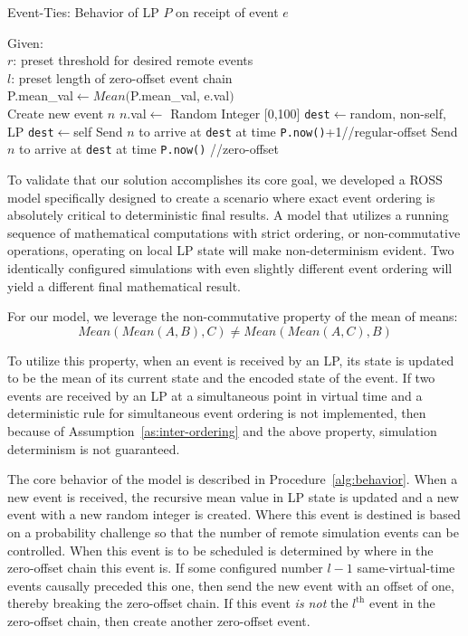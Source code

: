 \documentclass[nonacm,sigconf]{acmart}
\begin{document}
\begin{algorithm}
  \caption{Event-Ties: Behavior of LP $P$ on receipt of event $e$}\label{alg:behavior}
  \begin{algorithmic}
    \State Given:\\\hspace{.5cm}$r$: preset threshold for desired remote events\\\hspace{.5cm}$l$: preset length of zero-offset event chain\\
    \hrulefill
    \State P.mean\_val$\leftarrow Mean($P.mean\_val, e.val$)$
    \\
    \State Create new event $n$
    \State $n$.val$\leftarrow$ Random Integer [0,100]
      \State \texttt{dest}$\leftarrow$random, non-self, LP 
    \Else
      \State \texttt{dest}$\leftarrow$self
    \EndIf
      \State Send $n$ to arrive at \texttt{dest} at time \texttt{P.now()}+1\hfill //regular-offset
    \Else
      \State Send $n$ to arrive at \texttt{dest} at time \texttt{P.now()} \hfill //zero-offset
    \EndIf
    \end{algorithmic}
\end{algorithm}

To validate that our solution accomplishes its core goal, we developed a ROSS model specifically designed to create a scenario where exact event ordering is absolutely critical to deterministic final results. A model that utilizes a running sequence of mathematical computations with strict ordering, or non-commutative operations, operating on local LP state will make non-determinism evident. Two identically configured simulations with even slightly different event ordering will yield a different final mathematical result.

For our model, we leverage the non-commutative property of the mean of means: 
\[
Mean(Mean(A,B),C) \neq Mean(Mean(A,C),B)
\]


To utilize this property, when an event is received by an LP, its state is updated to be the mean of its current state and the encoded state of the event. If two events are received by an LP at a simultaneous point in virtual time and a deterministic rule for simultaneous event ordering is not implemented, then because of Assumption~\ref{as:inter-ordering} and the above property, simulation determinism is not guaranteed.

The core behavior of the model is described in Procedure~\ref{alg:behavior}. When a new event is received, the recursive mean value in LP state is updated and a new event with a new random integer is created. Where this event is destined is based on a probability challenge so that the number of remote simulation events can be controlled. When this event is to be scheduled is determined by where in the zero-offset chain this event is. If some configured number $l-1$ same-virtual-time events causally preceded this one, then send the new event with an offset of one, thereby breaking the zero-offset chain. If this event \emph{is not} the $l^{\text{th}}$ event in the zero-offset chain, then create another zero-offset event.
\end{document}
